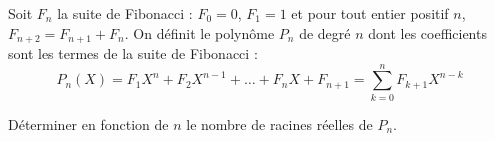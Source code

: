 Soit $F_n$ la suite de Fibonacci : $F_0=0$, $F_1=1$ et pour tout entier positif $n$, $F_{n+2}=F_{n+1}+F_n$.
On définit le polynôme $P_n$ de degré $n$ dont les coefficients sont les termes de la suite de Fibonacci :
$$P_n(X)= F_1X^n+F_2X^{n-1}+\dots +F_nX+F_{n+1}=\sum_{k=0}^n F_{k+1}X^{n-k}$$

Déterminer en fonction de $n$ le nombre de racines réelles de $P_n$.